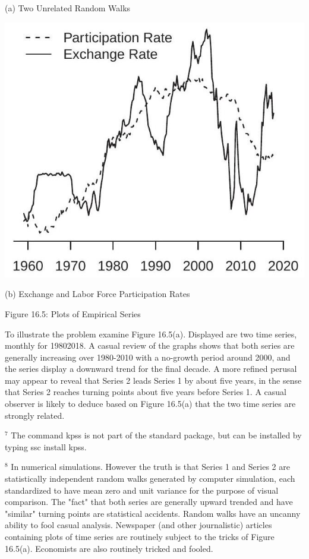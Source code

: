 \documentclass[10pt]{article}
\begin{document}
(a) Two Unrelated Random Walks

\includegraphics[max width=\textwidth]{2022_10_23_e99fc7c58db661c6f219g-25(1)}

(b) Exchange and Labor Force Participation Rates

Figure 16.5: Plots of Empirical Series

To illustrate the problem examine Figure 16.5(a). Displayed are two time series, monthly for 19802018. A casual review of the graphs shows that both series are generally increasing over 1980-2010 with a no-growth period around 2000, and the series display a downward trend for the final decade. A more refined perusal may appear to reveal that Series 2 leads Series 1 by about five years, in the sense that Series 2 reaches turning points about five years before Series 1. A casual observer is likely to deduce based on Figure 16.5(a) that the two time series are strongly related.

${ }^{7}$ The command kpss is not part of the standard package, but can be installed by typing ssc install kpss.

${ }^{8}$ In numerical simulations. However the truth is that Series 1 and Series 2 are statistically independent random walks generated by computer simulation, each standardized to have mean zero and unit variance for the purpose of visual comparison. The "fact" that both series are generally upward trended and have "similar" turning points are statistical accidents. Random walks have an uncanny ability to fool casual analysis. Newspaper (and other journalistic) articles containing plots of time series are routinely subject to the tricks of Figure 16.5(a). Economists are also routinely tricked and fooled.
\end{document}
